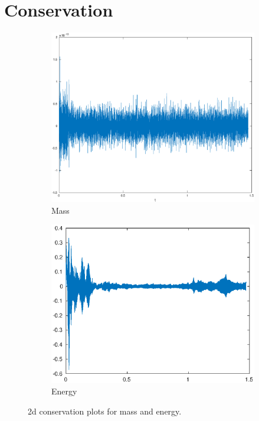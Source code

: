 \section{Conservation}
\begin{figure}[h!]
    \centering
    \begin{subfigure}[b]{0.46\textwidth}
        \centering
        \includegraphics[width=\textwidth]{images/cons_mass.eps}\hfill
        \caption{Mass}
        \label{fig:Energy}
    \end{subfigure}
    \hfill
    \begin{subfigure}[b]{0.45\textwidth}
        \centering
        \includegraphics[width=\textwidth]{images/cons_energy.eps}\hfill
        \caption{Energy}
        \label{fig:Mass}
    \end{subfigure}
    \caption{2d conservation plots for mass and energy.}
    \label{fig:three graphs}
\end{figure}

